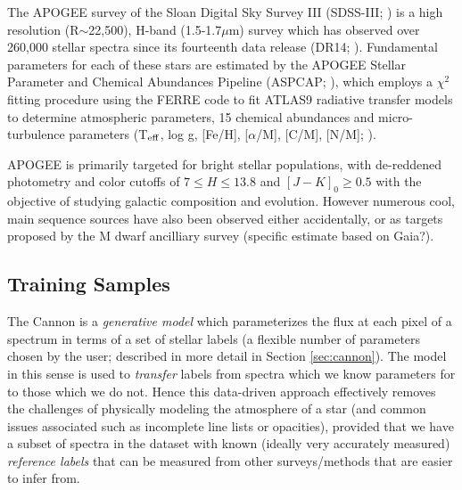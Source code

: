 \documentclass[modern]{aastex62}
\begin{document}

The APOGEE survey \citep{Majewski:2015} of the Sloan Digital Sky Survey III (SDSS-III; \citealt{Eisenstein:2011}) is a high resolution (R$\sim$22,500), H-band (1.5-1.7$\mu$m) survey which has observed over 260,000 stellar spectra since its fourteenth data release (DR14; \citealt{Abolfathi:2017}). Fundamental parameters for each of these stars are estimated by the APOGEE Stellar Parameter and Chemical Abundances Pipeline (ASPCAP; \citealt{Perez:2016}), which employs a $\chi^2$ fitting procedure using the FERRE code to fit ATLAS9 radiative transfer models \citep{Castelli:2004} to determine atmospheric parameters, 15 chemical abundances and micro-turbulence parameters (T$_{\rm eff}$, log g, [Fe/H], [$\alpha$/M], [C/M], [N/M]; \citealt{Meszaros:2012}). 

APOGEE is primarily targeted for bright stellar populations, with de-reddened photometry and color cutoffs of $7 \leq H \leq 13.8$ and $[J-K]_0 \geq 0.5$ \citep{Zasowski:2013} with the objective of studying galactic composition and evolution. However numerous cool, main sequence sources have also been observed either accidentally, or as targets proposed by the M dwarf ancilliary survey \citep{Desphande:2013} (specific estimate based on Gaia?).


\subsection{Training Samples}

The Cannon is a \emph{generative model} which parameterizes the flux at each pixel of a spectrum in terms of a set of stellar labels (a flexible number of parameters chosen by the user; described in more detail in Section \ref{sec:cannon}). The model in this sense is used to \emph{transfer} labels from spectra which we know parameters for to those which we do not. Hence this data-driven approach effectively removes the challenges of physically modeling the atmosphere of a star (and common issues associated such as incomplete line lists or opacities), provided that we have a subset of spectra in the dataset with known (ideally very accurately measured) \emph{reference labels} that can be measured from other surveys/methods that are easier to infer from. 
\end{document}
